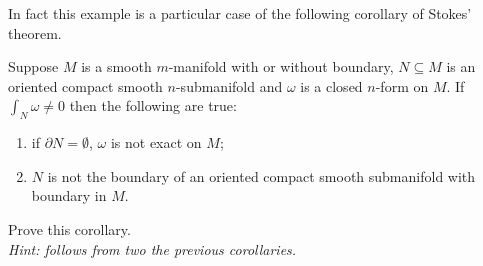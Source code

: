 In fact this example is a particular case of the following corollary of Stokes' theorem.

\begin{corollary}
	Suppose $M$ is a smooth $m$-manifold with or without boundary, $N\subseteq M$ is an oriented compact smooth $n$-submanifold and $\omega$ is a closed $n$-form on $M$.
	If $\int_N\omega \neq 0$ then the following are true:
	\begin{enumerate}
		\item if $\partial N = \emptyset$, $\omega$ is not exact on $M$;
		\item $N$ is not the boundary of an oriented compact smooth submanifold with boundary in $M$.
	\end{enumerate}
\end{corollary}
\begin{exercise}
	Prove this corollary. \\
	\textit{\small Hint: follows from two the previous corollaries.}
\end{exercise}


